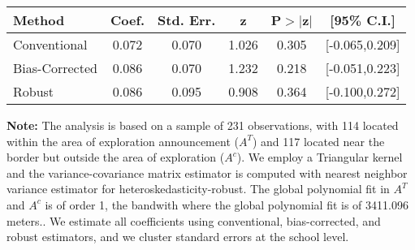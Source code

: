 \begin{table}[htbp]\centering
 \footnotesize 
\begin{tabular}{lccccc}
\hline\hline
Method & Coef. & Std. Err. & z & P$>|$z$|$ & [95\% C.I.] \\ 
\hline \hline  
Conventional & 0.072 & 0.070 & 1.026 & 0.305 & [-0.065,0.209] \\ 
 Bias-Corrected & 0.086 & 0.070 & 1.232 & 0.218 & [-0.051,0.223] \\ 
Robust & 0.086 & 0.095 & 0.908 & 0.364 & [-0.100,0.272] \\ 
  \hline\hline
\end{tabular}
\label{table:rd}
\begin{tablenotes} 
  \justifying \tiny \textbf{Note: }    
   The analysis is based on a sample of 231 observations, with 114 located within the area of exploration announcement ($A^{T}$) and 117 located near the border but outside the area of exploration  ($A^{c}$). 
           We employ a Triangular kernel and the variance-covariance matrix estimator is computed with nearest neighbor variance estimator for heteroskedasticity-robust. The global polynomial fit in  $A^{T}$ and $A^{c}$ is of order 1, the bandwith where the global polynomial fit is of 3411.096 meters.. We estimate all coefficients using conventional, bias-corrected, and robust estimators, and we cluster standard errors at the school level. \end{tablenotes} 
 \end{table} 
